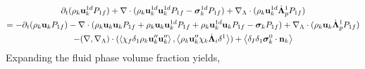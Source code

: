 \documentclass[11pt]{My_preprint}
\begin{document}
\begin{multline}
    \partial_t (\rho_k \textbf{u}_k^{1d}  P_{1f})
    + \mathbf{\nabla}\cdot (
         \rho_k \textbf{u}_k^{1d} \textbf{u}_k^{1d}  P_{1f}
        - \bm\sigma_k^{1d} P_{1f}
        )
    +  \mathbf{\nabla}_\Lambda \cdot ( \rho_k \textbf{u}_k^{1d} \dot{\bm\Lambda}_p^1  P_{1f} )\\
    = 
    - \partial_t (\rho_k \textbf{u}_k  P_{1f})
    - \mathbf{\nabla}\cdot (
        \rho_k \textbf{u}_k \textbf{u}_k  P_{1f}
        + \rho_k \textbf{u}_k \textbf{u}_k^{1d}  P_{1f}
        + \rho_k \textbf{u}_k^{1d} \textbf{u}_k  P_{1f}
        - \bm\sigma_k P_{1f}
        )
    +  \mathbf{\nabla}_\Lambda \cdot ( \rho_k \textbf{u}_k \dot{\bm\Lambda}_p^1  P_{1f} )\\
    - (\mathbf{\nabla},\mathbf{\nabla}_\Lambda)\cdot(\left<\chi_f \delta_1 \rho_k \textbf{u}''_k\textbf{u}''_k\right>,\left<\rho_k \textbf{u}_k'' \chi_k \dot{\bm\Lambda}_i \delta^1\right>)
    + \left<\delta_I\delta_1
         \bm\sigma_k^0
    \cdot \textbf{n}_k\right>\\ 
\end{multline}
Expanding the fluid phase volume fraction yields, 
\end{document}
